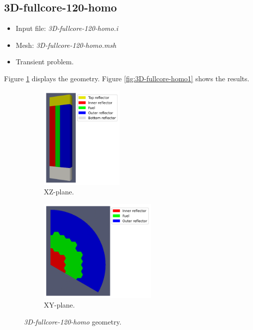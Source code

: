 \documentclass[11pt,letterpaper]{article}
\begin{document}
\subsection{3D-fullcore-120-homo}

	\begin{itemize}
		\item Input file: \textit{3D-fullcore-120-homo.i}
		\item Mesh: \textit{3D-fullcore-120-homo.msh}
		\item Transient problem.
	\end{itemize}

Figure \ref{fig:3D-fullcore-homo} displays the geometry.
Figure \ref{fig:3D-fullcore-homo1} shows the results.

	\begin{figure}[htbp!]
		\centering
		\begin{subfigure}[t]{0.4\textwidth}
			\centering
		\includegraphics[height=5cm]{3D-fullcore-120-homo-mesh}
			\caption{XZ-plane.}
		\end{subfigure}
		\begin{subfigure}[t]{0.4\textwidth}
			\centering
		\includegraphics[height=5cm]{3D-fullcore-120-homo-mesh2}
			\caption{XY-plane.}
		\end{subfigure}
		\hfill
		\caption{\textit{3D-fullcore-120-homo} geometry.}
		\label{fig:3D-fullcore-homo}
	\end{figure}
\end{document}
